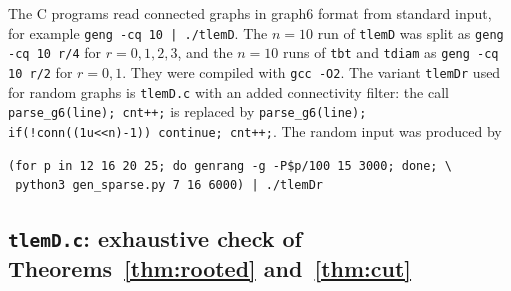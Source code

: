 \documentclass[11pt,a4paper]{article}
\theoremstyle{definition}
\begin{document}
The C programs read connected graphs in graph6 format from standard input, for example \verb+geng -cq 10 | ./tlemD+. The $n=10$ run of \texttt{tlemD} was split as \verb|geng -cq 10 r/4| for $r=0,1,2,3$, and the $n=10$ runs of \texttt{tbt} and \texttt{tdiam} as \verb|geng -cq 10 r/2| for $r=0,1$. They were compiled with \verb|gcc -O2|. The variant \texttt{tlemDr} used for random graphs is \texttt{tlemD.c} with an added connectivity filter: the call \verb|parse_g6(line); cnt++;| is replaced by \verb|parse_g6(line); if(!conn((1u<<n)-1)) continue; cnt++;|. The random input was produced by
\begin{verbatim}
(for p in 12 16 20 25; do genrang -g -P$p/100 15 3000; done; \
 python3 gen_sparse.py 7 16 6000) | ./tlemDr
\end{verbatim}

\subsection{\texttt{tlemD.c}: exhaustive check of Theorems~\ref{thm:rooted} and~\ref{thm:cut}}
\end{document}
